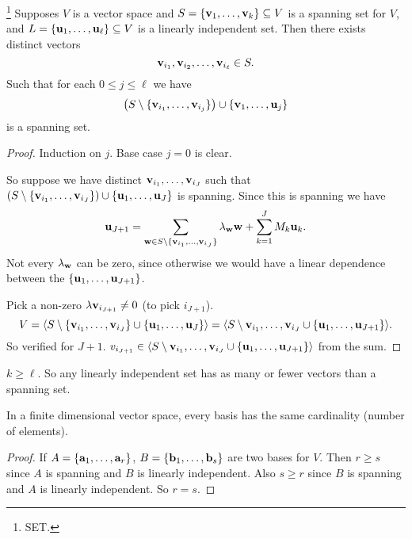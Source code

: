 \documentclass[10pt, a4paper]{article}
\begin{document}
\begin{theorem}\footnote{SET.}
    Supposes $V$ is a vector space and $S = \{\mathbf{v}_1, \dotsc, \mathbf{v}_k\} \subseteq V$ is a spanning set for $V$,
    and $L = \{\mathbf{u}_1, \dotsc, \mathbf{u}_{\ell}\} \subseteq V$ is a linearly independent set.
    Then there exists distinct vectors
    \[
    \mathbf{v}_{i_1}, \mathbf{v}_{i_2}, \dotsc, \mathbf{v}_{i_{\ell}} \in S.
    \]
    Such that for each $0 \leq j \leq \ell$ we have
    \[
    \left(S \setminus \{\mathbf{v}_{i_1}, \dotsc, \mathbf{v}_{i_j}\}\right) \cup \{\mathbf{v}_1, \dotsc, \mathbf{u}_j\}
    \]
    is a spanning set.
    \begin{proof}
        Induction on $j$.
        Base case $j = 0$ is clear.

        So suppose we have distinct $\mathbf{v}_{i_1}, \dotsc, \mathbf{v}_{i_J}$ such that
        $(S \setminus \{\mathbf{v}_{i_1}, \dotsc, \mathbf{v}_{i_J}\}) \cup \{\mathbf{u}_1, \dotsc, \mathbf{u}_J\}$ is spanning.
        Since this is spanning we have
        \[
        \mathbf{u}_{J + 1} = \sum_{\mathbf{w} \in S \setminus \{\mathbf{v}_{i_1}, \dotsc, \mathbf{v}_{i_J}\}}\lambda_{\mathbf{w}}\mathbf{w} + \sum_{k = 1}^{J}M_k\mathbf{u}_k.
        \]
        Not every $\lambda_{\mathbf{w}}$ can be zero,
        since otherwise we would have a linear dependence between the $\{\mathbf{u}_1, \dotsc, \mathbf{u}_{J + 1}\}$.

        Pick a non-zero $\lambda\mathbf{v}_{i_{J + 1}} \neq 0$
        (to pick $i_{J + 1}$).
        \[
        V = \langle S \setminus \{\mathbf{v}_{i_1}, \dotsc, \mathbf{v}_{i_J}\} \cup \{\mathbf{u}_1, \dotsc, \mathbf{u}_J\}\rangle = \langle S \setminus\mathbf{v}_{i_1}, \dotsc, \mathbf{v}_{i_J}\cup \{\mathbf{u}_{1}, \dotsc, \mathbf{u}_{J + 1}\}\rangle.
        \]
        So verified for $J + 1$.
        $v_{i_{J + 1}} \in \langle S \setminus\mathbf{v}_{i_1}, \dotsc, \mathbf{v}_{i_J}\cup \{\mathbf{u}_{1}, \dotsc, \mathbf{u}_{J + 1}\}\rangle$ from the sum.
    \end{proof}
\end{theorem}

\begin{corollary}
    $k \geq \ell$.
    So any linearly independent set has as many or fewer vectors than a spanning set.
\end{corollary}

\begin{corollary}
    In a finite dimensional vector space,
    every basis has the same cardinality
    (number of elements).
    \begin{proof}
        If $A = \{\mathbf{a}_1, \dotsc, \mathbf{a}_r\}$,
        $B = \{\mathbf{b}_1, \dotsc, \mathbf{b}_s\}$ are two bases for $V$.
        Then $r \geq s$ since $A$ is spanning and $B$ is linearly independent.
        Also $s \geq r$ since $B$ is spanning and $A$ is linearly independent.
        So $r = s$.
    \end{proof}
\end{corollary}
\end{document}
